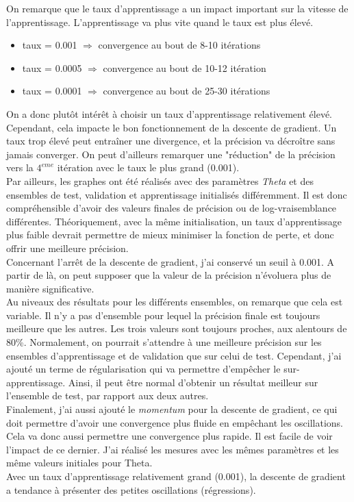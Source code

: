 \documentclass[12pt]{article}
\begin{document}
On remarque que le taux d'apprentissage a un impact important sur la vitesse de l'apprentissage. L'apprentissage va plus vite quand le taux est plus élevé.
\begin{itemize}
\item taux = 0.001 $\Rightarrow$ convergence au bout de 8-10 itérations
\item taux = 0.0005 $\Rightarrow$ convergence au bout de 10-12 itération
\item taux = 0.0001 $\Rightarrow$ convergence au bout de 25-30 itérations
\end{itemize}
On a donc plutôt intérêt à choisir un taux d'apprentissage relativement élevé. Cependant, cela impacte le bon fonctionnement de la descente de gradient. Un taux trop élevé peut entraîner une divergence, et la précision va décroître sans jamais converger. On peut d'ailleurs remarquer une "réduction" de la précision vers la $4^{eme}$ itération avec le taux le plus grand (0.001). 
\\ \linebreak
Par ailleurs, les graphes ont été réalisés avec des paramètres \textit{Theta} et des ensembles de test, validation et apprentissage initialisés différemment. Il est donc compréhensible d'avoir des valeurs finales de précision ou de log-vraisemblance différentes. Théoriquement, avec la même initialisation, un taux d'apprentissage plus faible devrait permettre de mieux minimiser la fonction de perte, et donc offrir une meilleure précision.
\\
Concernant l'arrêt de la descente de gradient, j'ai conservé un seuil à 0.001. A partir de là, on peut supposer que la valeur de la précision n'évoluera plus de manière significative.
\\ \linebreak
Au niveaux des résultats pour les différents ensembles, on remarque que cela est variable. Il n'y a pas d'ensemble pour lequel la précision finale est toujours meilleure que les autres. Les trois valeurs sont toujours proches, aux alentours de 80\%. Normalement, on pourrait s'attendre à une meilleure précision sur les ensembles d'apprentissage et de validation que sur celui de test. Cependant, j'ai ajouté un terme de régularisation qui va permettre d'empêcher le sur-apprentissage. Ainsi, il peut être normal d'obtenir un résultat meilleur sur l'ensemble de test, par rapport aux deux autres.
\\ \linebreak
Finalement, j'ai aussi ajouté le \textit{momentum} pour la descente de gradient, ce qui doit permettre d'avoir une convergence plus fluide en empêchant les oscillations. Cela va donc aussi permettre une convergence plus rapide.
Il est facile de voir l'impact de ce dernier. J'ai réalisé les mesures avec les mêmes paramètres et les même valeurs initiales pour Theta. \\ Avec un taux d'apprentissage relativement grand (0.001), la descente de gradient a tendance à présenter des petites oscillations (régressions).
\end{document}
